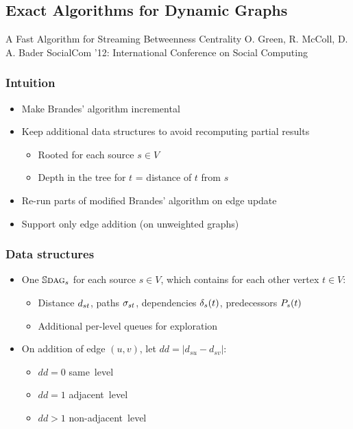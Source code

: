 \subsection{Exact Algorithms for Dynamic Graphs}

\begin{frame}
  \centering
  \vfill
  {\huge A Fast Algorithm for Streaming Betweenness Centrality}
  \vfill
  {\Large O. Green, R. McColl, D. A. Bader}
  \vfill
  {\large SocialCom '12: International Conference on Social Computing}
  \vfill
\end{frame}


\begin{frame}
  \frametitle{Intuition}

  \begin{itemize}
    \item Make Brandes' algorithm incremental
    \item Keep additional data structures to avoid recomputing partial results
    \begin{itemize}
      \item Rooted \spdag for each source $s \in V$
      \item Depth in the tree for $t$ = distance of $t$ from $s$
    \end{itemize}
    \item Re-run parts of modified Brandes' algorithm on edge update
    \item Support only edge addition (on unweighted graphs)
  \end{itemize}

\end{frame}


\begin{frame}
  \frametitle{Data structures}

  \begin{itemize}
    \item One $\mathbb{S}\textsc{dag}_s$ for each source $s \in V$, which contains for each other vertex $t \in V$:
    \begin{itemize}
      \item Distance $d_{st}$, paths $\sigma_{st}$, dependencies $\delta_{s}(t)$, predecessors $P_{s}(t)$
      \item Additional per-level queues for exploration
    \end{itemize}
  \end{itemize}
  \begin{itemize}
    \item On addition of edge $(u,v)$, let $dd = |d_{su} - d_{sv}|$:
    \begin{itemize}
      \item $dd = 0$ same~level
      \item $dd = 1$ adjacent~level
      \item $dd > 1$ non-adjacent~level
    \end{itemize}
  \end{itemize}

\end{frame}


